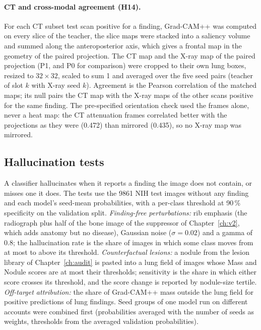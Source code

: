 \paragraph{CT and cross-modal agreement (H14).} For each CT subset test scan positive for a finding, Grad-CAM++ was computed on every slice
of the teacher, the slice maps were stacked into a saliency volume and summed along the anteroposterior axis, which gives a frontal map in
the geometry of the paired projection. The CT map and the X-ray map of the paired projection (P1, and P0 for comparison) were cropped to
their own lung boxes, resized to $32\times32$, scaled to sum 1 and averaged over the five seed pairs (teacher of slot $k$ with X-ray seed
$k$). Agreement is the Pearson correlation of the matched maps; its null pairs the CT map with the X-ray maps of the other scans positive
for the same finding. The pre-specified orientation check used the frames alone, never a heat map: the CT attenuation frames correlated
better with the projections as they were (0.472) than mirrored (0.435), so no X-ray map was mirrored.

\subsection{Hallucination tests}
\label{sec:xm_halluc}
A classifier hallucinates when it reports a finding the image does not contain, or misses one it does. The tests use the
\num{9861} NIH test images without any finding and each model's seed-mean probabilities, with a per-class threshold at 90\,\% specificity
on the validation split. \emph{Finding-free perturbations:} rib emphasis (the radiograph plus half of the bone image of the suppressor of
Chapter~\ref{ch:v2}, which adds anatomy but no disease), Gaussian noise ($\sigma=0.02$) and a gamma of 0.8; the hallucination rate is the
share of images in which some class moves from at most to above its threshold. \emph{Counterfactual lesions:} a nodule from the lesion
library of Chapter~\ref{ch:audit} is pasted into a lung field of images whose Mass and Nodule scores are at most their thresholds; sensitivity
is the share in which either score crosses its threshold, and the score change is reported by nodule-size tertile. \emph{Off-target
attribution:} the share of Grad-CAM++ mass outside the lung field for positive predictions of lung findings. Seed groups of one model run on
different accounts were combined first (probabilities averaged with the number of seeds as weights, thresholds from the averaged
validation probabilities).

